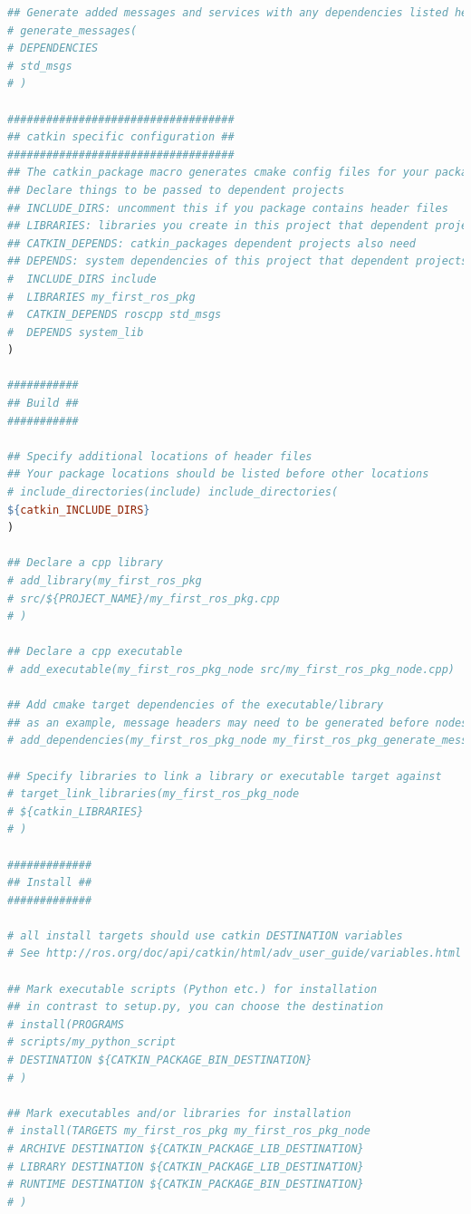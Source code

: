 \begin{lstlisting}[language=make]
## Generate added messages and services with any dependencies listed here
# generate_messages(
# DEPENDENCIES
# std_msgs
# )

###################################
## catkin specific configuration ##
###################################
## The catkin_package macro generates cmake config files for your package
## Declare things to be passed to dependent projects
## INCLUDE_DIRS: uncomment this if you package contains header files
## LIBRARIES: libraries you create in this project that dependent projects also need
## CATKIN_DEPENDS: catkin_packages dependent projects also need
## DEPENDS: system dependencies of this project that dependent projects also need catkin_package(
#  INCLUDE_DIRS include
#  LIBRARIES my_first_ros_pkg
#  CATKIN_DEPENDS roscpp std_msgs
#  DEPENDS system_lib
)

###########
## Build ##
###########

## Specify additional locations of header files
## Your package locations should be listed before other locations
# include_directories(include) include_directories(
${catkin_INCLUDE_DIRS}
)

## Declare a cpp library
# add_library(my_first_ros_pkg
# src/${PROJECT_NAME}/my_first_ros_pkg.cpp
# )

## Declare a cpp executable
# add_executable(my_first_ros_pkg_node src/my_first_ros_pkg_node.cpp)

## Add cmake target dependencies of the executable/library
## as an example, message headers may need to be generated before nodes
# add_dependencies(my_first_ros_pkg_node my_first_ros_pkg_generate_messages_cpp)

## Specify libraries to link a library or executable target against
# target_link_libraries(my_first_ros_pkg_node
# ${catkin_LIBRARIES}
# )

#############
## Install ##
#############

# all install targets should use catkin DESTINATION variables
# See http://ros.org/doc/api/catkin/html/adv_user_guide/variables.html

## Mark executable scripts (Python etc.) for installation
## in contrast to setup.py, you can choose the destination
# install(PROGRAMS
# scripts/my_python_script
# DESTINATION ${CATKIN_PACKAGE_BIN_DESTINATION}
# )

## Mark executables and/or libraries for installation
# install(TARGETS my_first_ros_pkg my_first_ros_pkg_node
# ARCHIVE DESTINATION ${CATKIN_PACKAGE_LIB_DESTINATION}
# LIBRARY DESTINATION ${CATKIN_PACKAGE_LIB_DESTINATION}
# RUNTIME DESTINATION ${CATKIN_PACKAGE_BIN_DESTINATION}
# )


\end{lstlisting}
